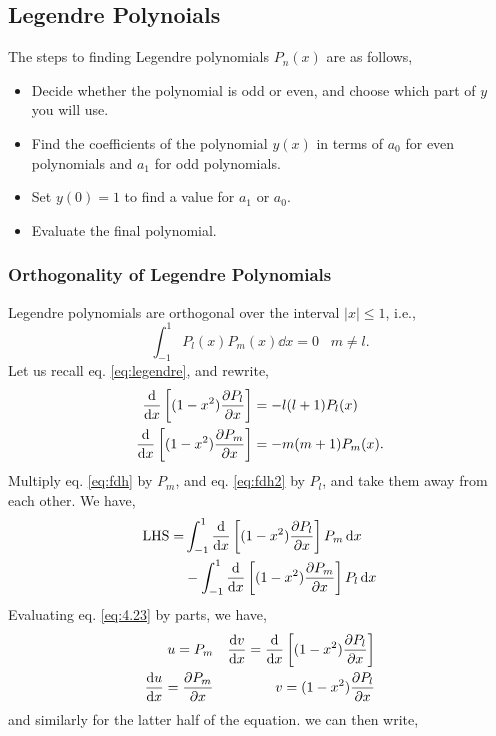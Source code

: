 \documentclass{book}
\begin{document}
\subsection{Legendre Polynoials}
The steps to finding Legendre polynomials $P_n(x)$ are as follows,
\begin{itemize}
	\item Decide whether the polynomial is odd or even, and choose which part of $y$ you will use.
	\item Find the coefficients of the polynomial $y(x)$ in terms of $a_0$ for even polynomials and $a_1$ for odd polynomials.
	\item Set $y(0) = 1$ to find a value for $a_1$ or $a_0$.
	\item Evaluate the final polynomial.
\end{itemize}
\subsubsection{Orthogonality of Legendre Polynomials}
Legendre polynomials are orthogonal over the interval $|x| \leq 1$, i.e.,
\begin{equation}
	\int_{-1}^{1} P_l(x) P_{m}(x) \dd{x} = 0 \hspace{10pt} m \neq l.
\end{equation}
Let us recall eq. \eqref{eq:legendre}, and rewrite,
\begin{align}
	\dv{x}\left[(1-x^2)\pdv{P_l}{x}\right]& = - l(l+1)P_l(x) \label{eq:fdh}\\
	\dv{x}\left[(1-x^2)\pdv{P_m}{x}\right]& = - m(m + 1)P_m(x). \label{eq:fdh2}
\end{align}
Multiply eq. \eqref{eq:fdh} by $P_m$, and eq. \eqref{eq:fdh2} by $P_l$, and take them away from each other. We have,
\begin{equation}
	\begin{split}
		\text{LHS} = & \int_{-1}^{1}\dv{x}\left[(1-x^2)\pdv{P_l}{x}\right]P_m\dd{x} \\
		& -\int_{-1}^{1}\dv{x}\left[(1-x^2)\pdv{P_m}{x}\right]P_l\dd{x}
	\end{split}\label{eq:4.23}
\end{equation}
Evaluating eq. \eqref{eq:4.23} by parts, we have,
	\begin{align}
		u = P_m && \dv{v}{x} = \dv{x}\left[(1-x^2)\pdv{P_l}{x}\right] \\
		\dv{u}{x} = \pdv{P_m}{x} && v = (1-x^2)\pdv{P_l}{x}
	\end{align}
and similarly for the latter half of the equation. we can then write,
\end{document}
